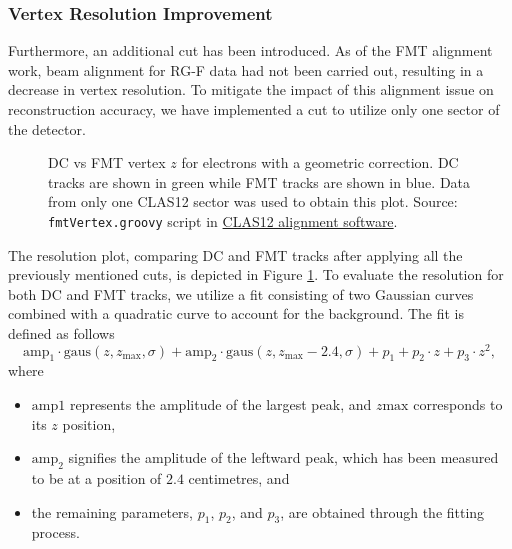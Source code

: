 \subsubsection{Vertex Resolution Improvement}
\label{sssec::vertex_resolution_improvement}
    Furthermore, an additional cut has been introduced.
    As of the FMT alignment work, beam alignment for RG-F data had not been carried out, resulting in a decrease in vertex resolution.
    To mitigate the impact of this alignment issue on reconstruction accuracy, we have implemented a cut to utilize only one sector of the detector.

    \begin{figure}[b!]
        \centering{}
        \caption[DC vs FMT $z$ with geometry correction]{DC vs FMT vertex $z$ for electrons with a geometric correction. DC tracks are shown in green while FMT tracks are shown in blue. Data from only one CLAS12 sector was used to obtain this plot.
        Source: \texttt{fmtVertex.groovy} script in \hyperlink{github.com/JeffersonLab/clas12alignment}{CLAS12 alignment software}.}
        \label{fig::dc_vs_fmt_vz_011983_corrected}
    \end{figure}

    The resolution plot, comparing DC and FMT tracks after applying all the previously mentioned cuts, is depicted in Figure \ref{fig::dc_vs_fmt_vz_011983_corrected}.
    To evaluate the resolution for both DC and FMT tracks, we utilize a fit consisting of two Gaussian curves combined with a quadratic curve to account for the background.
    The fit is defined as follows
    \begin{equation*}
        \text{amp}_1 \cdot \text{gaus}(z, z_\text{max}, \sigma) + \text{amp}_2 \cdot \text{gaus}(z, z_\text{max} - 2.4, \sigma) + p_1 + p_2\cdot z + p_3\cdot z^2,
    \end{equation*}
    where
    \begin{itemize}
        \item
            $\text{amp}1$ represents the amplitude of the largest peak, and $z\text{max}$ corresponds to its $z$ position,
        \item
            $\text{amp}_2$ signifies the amplitude of the leftward peak, which has been measured to be at a position of $2.4$ centimetres, and
        \item
            the remaining parameters, $p_1$, $p_2$, and $p_3$, are obtained through the fitting process.
    \end{itemize}


